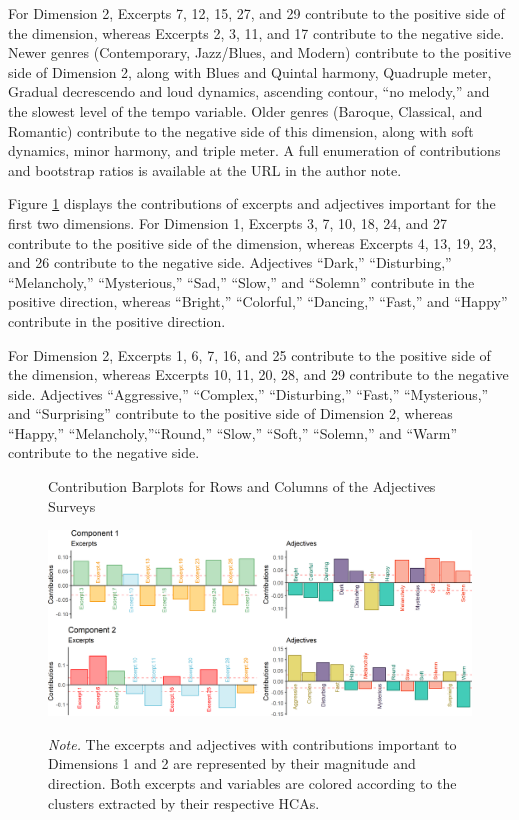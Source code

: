 \documentclass[
  english,
  man,floatsintext]{apa6}
\begin{document}
For Dimension 2, Excerpts 7, 12, 15, 27, and 29 contribute to the positive side of the dimension, whereas Excerpts 2, 3, 11, and 17 contribute to the negative side. Newer genres (Contemporary, Jazz/Blues, and Modern) contribute to the positive side of Dimension 2, along with Blues and Quintal harmony, Quadruple meter, Gradual decrescendo and loud dynamics, ascending contour, ``no melody,'' and the slowest level of the tempo variable. Older genres (Baroque, Classical, and Romantic) contribute to the negative side of this dimension, along with soft dynamics, minor harmony, and triple meter. A full enumeration of contributions and bootstrap ratios is available at the URL in the author note.

Figure \ref{fig:contributionsA} displays the contributions of excerpts and adjectives important for the first two dimensions. For Dimension 1, Excerpts 3, 7, 10, 18, 24, and 27 contribute to the positive side of the dimension, whereas Excerpts 4, 13, 19, 23, and 26 contribute to the negative side. Adjectives ``Dark,'' ``Disturbing,'' ``Melancholy,'' ``Mysterious,'' ``Sad,'' ``Slow,'' and ``Solemn'' contribute in the positive direction, whereas ``Bright,'' ``Colorful,'' ``Dancing,'' ``Fast,'' and ``Happy'' contribute in the positive direction.

For Dimension 2, Excerpts 1, 6, 7, 16, and 25 contribute to the positive side of the dimension, whereas Excerpts 10, 11, 20, 28, and 29 contribute to the negative side. Adjectives ``Aggressive,'' ``Complex,'' ``Disturbing,'' ``Fast,'' ``Mysterious,'' and ``Surprising'' contribute to the positive side of Dimension 2, whereas ``Happy,'' ``Melancholy,''``Round,'' ``Slow,'' ``Soft,'' ``Solemn,'' and ``Warm'' contribute to the negative side.

\begin{figure}   
  \centering  
  \caption{Contribution Barplots for Rows and Columns of the Adjectives Surveys}
    \includegraphics{./Music-Descriptor-Space_files/figure-latex/contributionsA-1.png}
  \label{fig:contributionsA}
  \caption*{\footnotesize \textit{Note.} The excerpts and adjectives with contributions important to Dimensions 1 and 2 are represented by their magnitude and direction. Both excerpts and variables are colored according to the clusters extracted by their respective HCAs.}
\end{figure}
\end{document}
